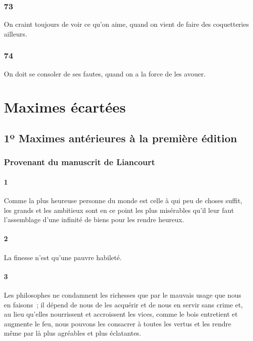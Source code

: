 \documentclass[french,twoside]{book} %
\begin{document}
\subsubsection[{73}]{ \textsc{73} }
\noindent On craint toujours de voir ce qu’on aime, quand on vient de faire des coquetteries ailleurs.
\subsubsection[{74}]{ \textsc{74} }
\noindent On doit se consoler de ses fautes, quand on a la force de les avouer.
\section[{Maximes écartées}]{Maximes écartées}\renewcommand{\leftmark}{Maximes écartées}

\subsection[{1º Maximes antérieures à la première édition}]{1º Maximes antérieures à la première édition}
\subsubsection[{Provenant du manuscrit de Liancourt}]{Provenant du manuscrit de Liancourt}
\paragraph[{1}]{ \textsc{1} }
\noindent Comme la plus heureuse personne du monde est celle à qui peu de choses suffit, les grands et les ambitieux sont en ce point les plus misérables qu’il leur faut l’assemblage d’une infinité de biens pour les rendre heureux.
\paragraph[{2}]{ \textsc{2} }
\noindent La finesse n’est qu’une pauvre habileté.
\paragraph[{3}]{ \textsc{3} }
\noindent Les philosophes ne condamnent les richesses que par le mauvais usage que nous en faisons ; il dépend de nous de les acquérir et de nous en servir sans crime et, au lieu qu’elles nourrissent et accroissent les vices, comme le bois entretient et augmente le feu, nous pouvons les consacrer à toutes les vertus et les rendre même par là plus agréables et plus éclatantes.
\end{document}
